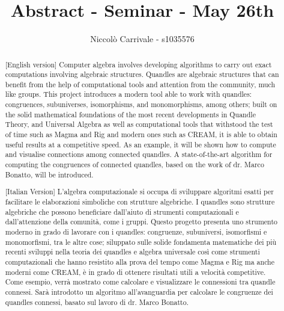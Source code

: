 \documentclass{Thesis/mcom-l}
\begin{document}
\title{Abstract - Seminar - May 26th}
\author{Niccolò Carrivale - s1035576}

\maketitle

\begin{abstract}[\textsf{English version}]
    Computer algebra involves developing algorithms to carry out exact computations involving algebraic structures. Quandles are algebraic structures that can benefit from the help of computational tools and attention from the community, much like groups. This project introduces a modern tool able to work with quandles: congruences, subuniverses, isomorphisms, and monomorphisms, among others; built on the solid mathematical foundations of the most recent developments in Quandle Theory, and Universal Algebra as well as computational tools that withstood the test of time such as Magma and Rig and modern ones such as CREAM, it is able to obtain useful results at a competitive speed. As an example, it will be shown how to compute and visualise connections among connected quandles.
    A state-of-the-art algorithm for computing the congruences of connected quandles, based on the work of dr. Marco Bonatto, will be introduced.
\end{abstract}
\begin{abstract}[\textsf{Italian Version}]
    L'algebra computazionale si occupa di sviluppare algoritmi esatti per facilitare le elaborazioni simboliche con strutture algebriche. I quandles sono strutture algebriche che possono beneficiare dall'aiuto di strumenti computazionali e dall'attenzione della comunità, come i gruppi. Questo progetto presenta uno strumento moderno in grado di lavorare con i quandles: congruenze, subuniversi, isomorfismi e monomorfismi, tra le altre cose; siluppato sulle solide fondamenta matematiche dei più recenti sviluppi nella teoria dei quandles e algebra universale così come strumenti computazionali che hanno resistito alla prova del tempo come Magma e Rig ma anche moderni come CREAM, è in grado di ottenere risultati utili a velocità competitive. Come esempio, verrà mostrato come calcolare e visualizzare le connessioni tra quandle connessi. Sarà introdotto un algoritmo all'avanguardia per calcolare le congruenze dei quandles connessi, basato sul lavoro di dr. Marco Bonatto.
\end{abstract}
\end{document}
